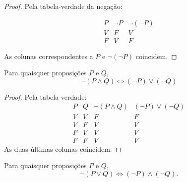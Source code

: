 \documentclass[../../main]{subfiles}
\begin{document}
\begin{proof}
	Pela tabela-verdade da negação:

	\begin{equation*}
		\begin{array}{c|c|c}
			P & \neg P & \neg(\neg P) \\
			\hline
			V & F      & V            \\
			F & V      & F
		\end{array}
	\end{equation*}

	As colunas correspondentes a \(P\) e \(\neg(\neg P)\) coincidem.

\end{proof}

\begin{prop}
	\label{prop:matematica:logica-matematica:logica-proposicional:primeira-lei-de-morgan}

	Para quaisquer proposições \(P\) e \(Q\),
	\begin{equation*}
		\neg(P \land Q) \Leftrightarrow (\neg P)\lor(\neg Q)
	\end{equation*}
\end{prop}

\begin{proof}
	Pela tabela-verdade:
	\begin{equation*}
		\begin{array}{c|c|c|c}
			P & Q & \neg(P \land Q) & (\neg P)\lor(\neg Q) \\
			\hline
			V & V & F               & F                    \\
			V & F & V               & V                    \\
			F & V & V               & V                    \\
			F & F & V               & V
		\end{array}
	\end{equation*}
	As duas últimas colunas coincidem.

\end{proof}

\begin{prop}
	\label{prop:matematica:logica-matematica:logica-proposicional:segunda-lei-de-morgan}

	Para quaisquer proposições \(P\) e \(Q\),
	\begin{equation*}
		\neg(P \lor Q) \Leftrightarrow (\neg P)\land(\neg Q).
	\end{equation*}
\end{prop}
\end{document}
